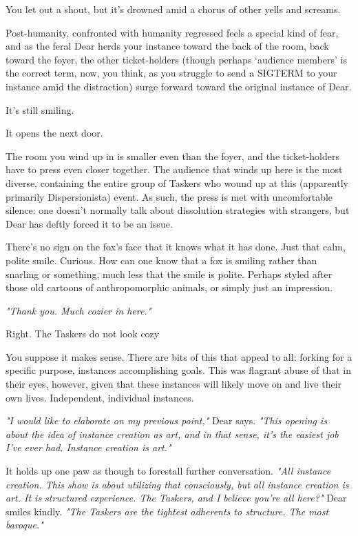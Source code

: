 You let out a shout, but it's drowned amid a chorus of other yells and screams.

Post-humanity, confronted with humanity regressed feels a special kind of fear, and as the feral Dear herds your instance toward the back of the room, back toward the foyer, the other ticket-holders (though perhaps `audience members' is the correct term, now, you think, as you struggle to send a SIGTERM to your instance amid the distraction) surge forward toward the original instance of Dear.

It's still smiling.

It opens the next door.

\newpage



\newpage

\label{right-door}

The room you wind up in is smaller even than the foyer, and the ticket-holders have to press even closer together. The audience that winds up here is the most diverse, containing the entire group of Taskers who wound up at this (apparently primarily Dispersionista) event. As such, the press is met with uncomfortable silence: one doesn't normally talk about dissolution strategies with strangers, but Dear has deftly forced it to be an issue.

There's no sign on the fox's face that it knows what it has done. Just that calm, polite smile. Curious. How can one know that a fox is smiling rather than snarling or something, much less that the smile is polite. Perhaps styled after those old cartoons of anthropomorphic animals, or simply just an impression.

\emph{"Thank you. Much cozier in here."}

Right. The Taskers do not look cozy

You suppose it makes sense. There are bits of this that appeal to all: forking for a specific purpose, instances accomplishing goals. This was flagrant abuse of that in their eyes, however, given that these instances will likely move on and live their own lives. Independent, individual instances.

\emph{"I would like to elaborate on my previous point,"} Dear says. \emph{"This opening is about the idea of instance creation as art, and in that sense, it's the easiest job I've ever had. Instance creation is art."}

It holds up one paw as though to forestall further conversation. \emph{"All instance creation. This show is about utilizing that consciously, but all instance creation is art. It is structured experience. The Taskers, and I believe you're all here?"} Dear smiles kindly. \emph{"The Taskers are the tightest adherents to structure. The most baroque."}

